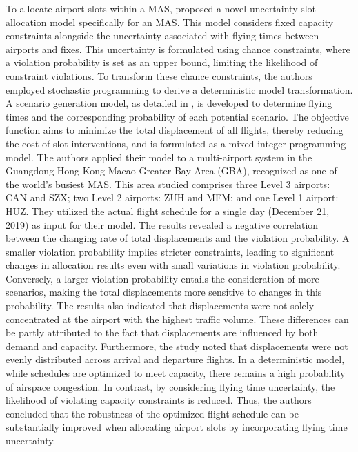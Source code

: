 To allocate airport slots within a \acrfull{MAS},  proposed a novel uncertainty slot allocation model specifically for an \acrshort{MAS}. This model considers fixed capacity constraints alongside the uncertainty associated with flying times between airports and fixes. This uncertainty is formulated using chance constraints, where a violation probability is set as an upper bound, limiting the likelihood of constraint violations. To transform these chance constraints, the authors employed stochastic programming to derive a deterministic model transformation. A scenario generation model, as detailed in , is developed to determine flying times and the corresponding probability of each potential scenario. The objective function aims to minimize the total displacement of all flights, thereby reducing the cost of slot interventions, and is formulated as a mixed-integer programming model. The authors applied their model to a multi-airport system in the Guangdong-Hong Kong-Macao Greater Bay Area (GBA), recognized as one of the world's busiest \acrshort{MAS}. This area studied comprises three Level 3 airports: \acrfull{CAN} and \acrfull{SZX}; two Level 2 airports: \acrfull{ZUH} and \acrfull{MFM}; and one Level 1 airport: \acrfull{HUZ}. They utilized the actual flight schedule for a single day (December 21, 2019) as input for their model. The results revealed a negative correlation between the changing rate of total displacements and the violation probability. A smaller violation probability implies stricter constraints, leading to significant changes in allocation results even with small variations in violation probability. Conversely, a larger violation probability entails the consideration of more scenarios, making the total displacements more sensitive to changes in this probability. The results also indicated that displacements were not solely concentrated at the airport with the highest traffic volume. These differences can be partly attributed to the fact that displacements are influenced by both demand and capacity. Furthermore, the study noted that displacements were not evenly distributed across arrival and departure flights. In a deterministic model, while schedules are optimized to meet capacity, there remains a high probability of airspace congestion. In contrast, by considering flying time uncertainty, the likelihood of violating capacity constraints is reduced. Thus, the authors concluded that the robustness of the optimized flight schedule can be substantially improved when allocating airport slots by incorporating flying time uncertainty.

